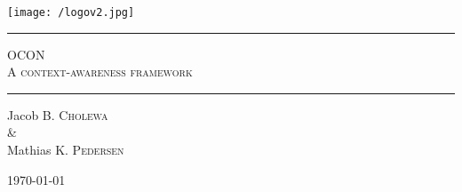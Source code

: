 \begin{titlepage}
\begin{center}

\vspace{2cm}

\centering\texttt{[image: /logov2.jpg]}

\vspace{1cm}

\rule{\linewidth}{0.6mm}

\textsc{\LARGE OCON}\\
\textsc{\large A context-awareness framework}
\vspace{0.2cm}
\rule{\linewidth}{0.4mm}

Jacob B. \textsc{Cholewa}
\\ \& \\
Mathias K. \textsc{Pedersen}

\vfill

\large \today
\end{center}


\end{titlepage}